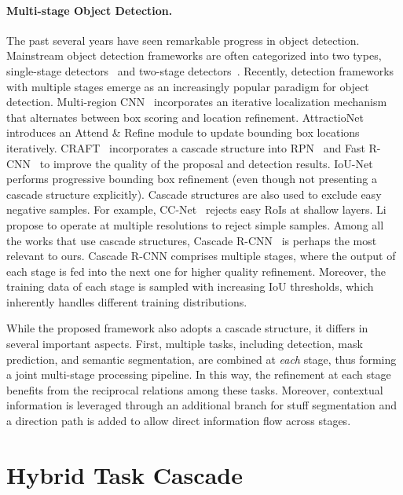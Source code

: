 \documentclass[10pt,twocolumn,letterpaper]{article}
\begin{document}
\paragraph{Multi-stage Object Detection.}
The past several years have seen remarkable progress in object detection.
Mainstream object detection frameworks are often categorized into two types,
single-stage detectors~\cite{liu2016ssd,redmon2016you,lin2017focal}
and two-stage detectors~\cite{ren2015faster,dai16rfcn,he2017mask,Libra2019CVPR}.
Recently, detection frameworks with multiple stages emerge as an increasingly
popular paradigm for object detection.
Multi-region CNN~\cite{gidaris2015object} incorporates an iterative
localization mechanism that alternates between box scoring and location
refinement.
AttractioNet~\cite{gidaris2016attend} introduces an Attend \& Refine module
to update bounding box locations iteratively.
CRAFT~\cite{binyang16craft} incorporates a cascade structure into
RPN~\cite{ren2015faster} and Fast R-CNN~\cite{girshick2015fast} to improve
the quality of the proposal and detection results.
IoU-Net~\cite{jiang2018acquisition} performs progressive bounding box refinement
(even though not presenting a cascade structure explicitly).
Cascade structures are also used to exclude easy negative samples.
For example,
CC-Net~\cite{ouyang2017learning} rejects easy RoIs at shallow layers.
Li \etal~\cite{li2015convolutional} propose to operate at multiple resolutions
to reject simple samples.
Among all the works that use cascade structures,
Cascade R-CNN~\cite{cai18cascadercnn} is perhaps the most relevant to ours.
Cascade R-CNN comprises multiple stages, where the output of each stage is fed
into the next one for higher quality refinement.
Moreover, the training data of each stage is sampled with increasing IoU
thresholds, which inherently handles different training distributions.

While the proposed framework also adopts a cascade structure, it differs
in several important aspects. First, multiple tasks, including detection,
mask prediction, and semantic segmentation, are combined at \emph{each}
stage, thus forming a joint multi-stage processing pipeline. In this way,
the refinement at each stage benefits from the reciprocal relations among
these tasks. Moreover, contextual information is leveraged through an
additional branch for stuff segmentation and a direction path is added to
allow direct information flow across stages. 
 

\section{Hybrid Task Cascade}
\label{sec:methodology}
\end{document}
